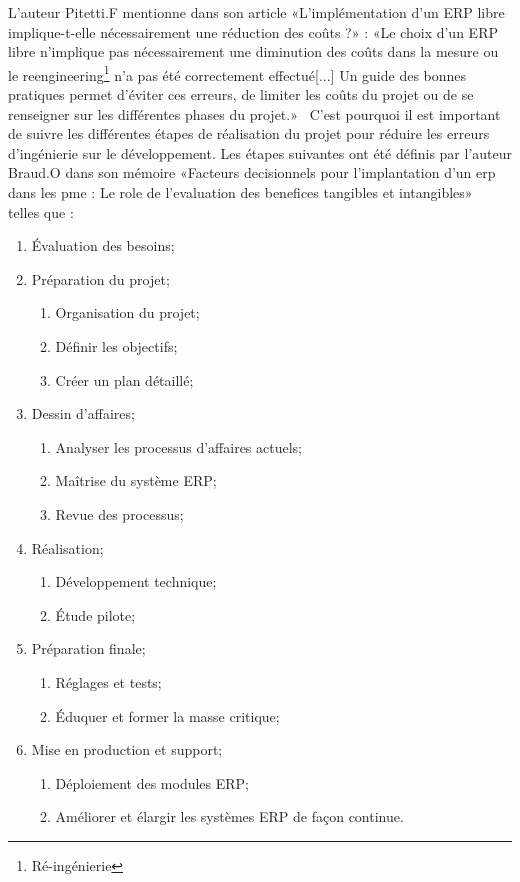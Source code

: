 L'auteur Pitetti.F mentionne dans son article «L’implémentation d’un ERP libre implique-t-elle nécessairement une réduction des coûts ?» : «Le choix d’un ERP libre n’implique pas nécessairement une diminution des coûts dans la mesure ou le reengineering\footnote{Ré-ingénierie} n’a pas été correctement effectué[...] Un guide des bonnes pratiques permet d’éviter ces erreurs, de limiter les coûts du projet ou de se renseigner sur les différentes phases du projet.»~\cite{pitetti2010implementation} C'est pourquoi il est important de suivre les différentes étapes de réalisation du projet pour réduire les erreurs d'ingénierie sur le développement. Les étapes suivantes ont été définis par l'auteur Braud.O dans son mémoire «Facteurs decisionnels pour l’implantation d’un erp dans les pme : Le role de l’evaluation des benefices tangibles et intangibles»~\cite{uqam_erp_benefice_2008} telles que :
\begin{enumerate}
    \item Évaluation des besoins;
    \item Préparation du projet;
    \begin{enumerate}
        \item Organisation du projet;
        \item Définir les objectifs;
        \item Créer un plan détaillé;
    \end{enumerate}
    \item Dessin d’affaires;
    \begin{enumerate}
        \item Analyser les processus d’affaires actuels;
        \item Maîtrise du système ERP;
        \item Revue des processus;
    \end{enumerate}
    \item Réalisation;
    \begin{enumerate}
        \item Développement technique;
        \item Étude pilote;
    \end{enumerate}
    \item Préparation finale;
    \begin{enumerate}
        \item Réglages et tests;
        \item Éduquer et former la masse critique;
    \end{enumerate}
    \item Mise en production et support;
    \begin{enumerate}
        \item Déploiement des modules ERP;
        \item Améliorer et élargir les systèmes ERP de façon continue.
    \end{enumerate}
\end{enumerate}

